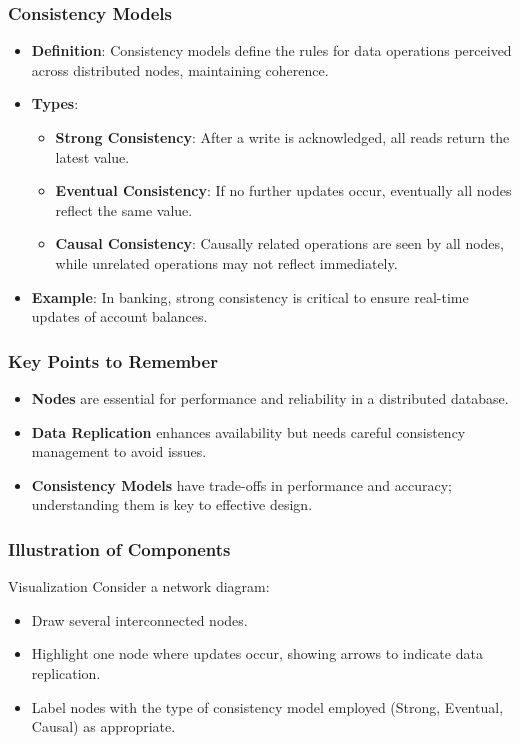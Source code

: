 \documentclass[aspectratio=169]{beamer}
\begin{document}
\begin{frame}[fragile]
  \frametitle{Consistency Models}
  \begin{itemize}
    \item \textbf{Definition}: Consistency models define the rules for data operations perceived across distributed nodes, maintaining coherence.
    \item \textbf{Types}:
    \begin{itemize}
      \item \textbf{Strong Consistency}: After a write is acknowledged, all reads return the latest value.
      \item \textbf{Eventual Consistency}: If no further updates occur, eventually all nodes reflect the same value.
      \item \textbf{Causal Consistency}: Causally related operations are seen by all nodes, while unrelated operations may not reflect immediately.
    \end{itemize}
    \item \textbf{Example}: In banking, strong consistency is critical to ensure real-time updates of account balances.
  \end{itemize}
\end{frame}

\begin{frame}[fragile]
  \frametitle{Key Points to Remember}
  \begin{itemize}
    \item \textbf{Nodes} are essential for performance and reliability in a distributed database.
    \item \textbf{Data Replication} enhances availability but needs careful consistency management to avoid issues.
    \item \textbf{Consistency Models} have trade-offs in performance and accuracy; understanding them is key to effective design.
  \end{itemize}
\end{frame}

\begin{frame}[fragile]
  \frametitle{Illustration of Components}
  \begin{block}{Visualization}
    Consider a network diagram:
    \begin{itemize}
      \item Draw several interconnected nodes.
      \item Highlight one node where updates occur, showing arrows to indicate data replication.
      \item Label nodes with the type of consistency model employed (Strong, Eventual, Causal) as appropriate.
    \end{itemize}
  \end{block}
\end{frame}
\end{document}
